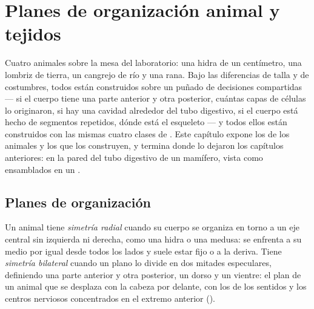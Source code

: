 \chapter{Planes de organización animal y tejidos}\label{ch:b1:body-plans-tissues}

Cuatro animales sobre la mesa del laboratorio: una hidra de un centímetro,
una lombriz de tierra, un cangrejo de río y una rana. Bajo las diferencias
de talla y de costumbres, todos están construidos sobre un puñado de
decisiones compartidas --- si el cuerpo tiene una parte anterior y otra
posterior, cuántas capas de células lo originaron, si hay una cavidad
alrededor del tubo digestivo, si el cuerpo está hecho de segmentos
repetidos, dónde está el esqueleto --- y todos ellos están construidos con
las mismas cuatro clases de . Este capítulo expone los  de los animales y los  que los construyen, y termina
donde lo dejaron los capítulos anteriores: en la pared del tubo digestivo de
un mamífero, vista como  ensamblados en un .

\section{Planes de organización}

\begin{definition}\label{def:b1:body-plans-tissues:symmetry}
Un animal tiene \emph{simetría radial} cuando su
cuerpo se organiza en torno a un eje central sin izquierda ni derecha, como
una hidra o una medusa: se enfrenta a su medio por igual desde todos los
lados y suele estar fijo o a la deriva. Tiene \emph{simetría
bilateral} cuando un plano lo divide en dos
mitades especulares, definiendo una parte anterior y otra posterior, un
dorso y un vientre: el plan de un animal que se desplaza con la cabeza por
delante, con los  de los sentidos y los centros nerviosos
concentrados en el extremo anterior ().
\end{definition}


